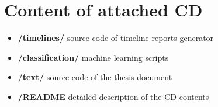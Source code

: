 





\chapter{Content of attached CD}
\begin{itemize}
\item \textbf{/timelines/} source code of timeline reports generator
\item \textbf{/classification/} machine learning scripts
\item \textbf{/text/} source code of the thesis document
\item \textbf{/README} detailed description of the CD contents
\end{itemize}